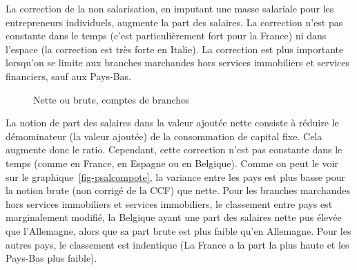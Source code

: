 \documentclass[
  french,
  9pt,
  a4paper,
]{article}
\begin{document}
La correction de la non salarisation, en imputant une masse salariale
pour les entrepreneurs individuels, augmente la part des salaires. La
correction n'est pas constante dans le temps (c'est particulièrement
fort pour la France) ni dans l'espace (la correction est très forte en
Italie). La correction est plus importante lorsqu'on se limite aux
branches marchandes hors services immobiliers et services financiers,
sauf aux Pays-Bas.

\begin{figure}[H]

\caption{\label{fig-psalnetbrut}Nette ou brute, comptes de branches}


\end{figure}%

La notion de part des salaires dans la valeur ajoutée nette consiste à
réduire le démominateur (la valeur ajoutée) de la consommation de
capital fixe. Cela augmente donc le ratio. Cependant, cette correction
n'est pas constante dans le temps (comme en France, en Espagne ou en
Belgique). Comme on peut le voir sur le graphique~\ref{fig-psalcompote},
la variance entre les pays est plus basse pour la notion brute (non
corrigé de la CCF) que nette. Pour les branches marchandes hors services
immobiliers et services immobiliers, le classement entre pays est
marginalement modifié, la Belgique ayant une part des salaires nette pus
élevée que l'Allemagne, alors que sa part brute est plus faible qu'en
Allemagne. Pour les autres pays, le classement est indentique (La France
a la part la plus haute et les Pays-Bas plus faible).
\end{document}
